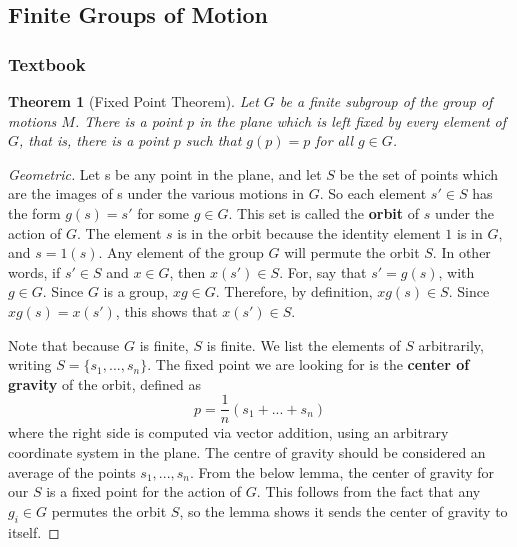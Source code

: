 \documentclass[12pt]{article}
\newtheorem{thm}{Theorem}[section]
\theoremstyle{definition}
\theoremstyle{remark}
\numberwithin{equation}{section}
\newcommand\B[1]{\textbf{ #1}}
\begin{document}
\vspace{15pt}


\subsection{Finite Groups of Motion}

\subsubsection{Textbook}

\begin{thm}[Fixed Point Theorem]
        Let $G$ be a finite subgroup of the group of motions $M$. There is a point $p$ in the plane which is left fixed by every element of $G$, that is, there is a point $p$ such that $g(p) = p$ for all $g\in G$.
\end{thm}
\begin{proof}
        [Geometric] Let s be any point in the plane, and let $S$ be the set of points which are the images of s under the various motions in $G$. So each element $s' \in S$ has the form $g(s) = s'$ for some $g \in G$. This set is called the \B{orbit} of $s$ under the action of $G$. The element $s$ is in the orbit because the identity element $1$ is in $G$, and $s = 1(s)$. Any element of the group $G$ will permute the orbit $S$. In other words, if $s' \in S$ and $x \in G$, then $x(s') \in S$. For, say that $s' = g(s)$, with $g \in G$. Since $G$ is a group, $xg \in G$. Therefore, by definition, $xg(s) \in S$. Since $xg(s) = x(s')$, this shows that $x(s') \in S$.


        Note that because $G$ is finite, $S$ is finite. We list the elements of $S$ arbitrarily, writing $S = \{s_1,...,s_n\}$. The fixed point we are looking for is the \B{center of gravity} of the orbit, defined as \begin{equation}
                p = \frac{1}{n}(s_1+...+s_n)
        \end{equation}
        where the right side is computed via vector addition, using an arbitrary coordinate system in the plane. The centre of gravity should be considered an average of the points $s_1,...,s_n$. From the below lemma, the center of gravity for our $S$ is a fixed point for the action of $G$. This follows from the fact that any $g_i \in G$ permutes the orbit $S$, so the lemma shows it sends the center of gravity to itself.
\end{proof}


\vspace{15pt}
\end{document}
